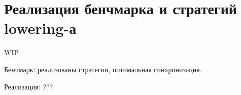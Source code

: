 \section{Реализация бенчмарка и стратегий lowering-а}
\label{sec:Chapter9} 

WIP

Бенчмарк: реализованы стратегии, оптимальная синхронизация.

Реализация: ???

\newpage
